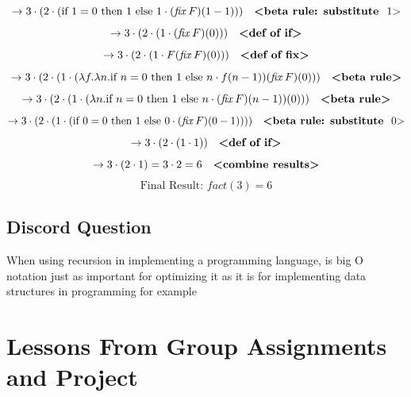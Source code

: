 \documentclass{article}
\theoremstyle{plain}
\theoremstyle{definition}
\theoremstyle{remark}
\begin{document}
\[
\to 3 \cdot (2 \cdot (\text{if } 1 = 0 \text{ then } 1 \text{ else } 1 \cdot (\mathit{fix} \, F)(1-1))) \quad \text{\textbf{<beta rule: substitute } 1\text{>}}
\]
\[
\to 3 \cdot (2 \cdot (1 \cdot (\mathit{fix} \, F)(0))) \quad \text{\textbf{<def of if>}}
\]
\[
\to 3 \cdot (2 \cdot (1 \cdot F(\mathit{fix} \, F)(0))) \quad \text{\textbf{<def of fix>}}
\]
\[
\to 3 \cdot (2 \cdot (1 \cdot (\lambda f. \lambda n. \text{if } n = 0 \text{ then } 1 \text{ else } n \cdot f(n-1))(\mathit{fix} \, F)(0))) \quad \text{\textbf{<beta rule>}}
\]
\[
\to 3 \cdot (2 \cdot (1 \cdot (\lambda n. \text{if } n = 0 \text{ then } 1 \text{ else } n \cdot (\mathit{fix} \, F)(n-1))(0))) \quad \text{\textbf{<beta rule>}}
\]
\[
\to 3 \cdot (2 \cdot (1 \cdot (\text{if } 0 = 0 \text{ then } 1 \text{ else } 0 \cdot (\mathit{fix} \, F)(0-1)))) \quad \text{\textbf{<beta rule: substitute } 0\text{>}}
\]
\[
\to 3 \cdot (2 \cdot (1 \cdot 1)) \quad \text{\textbf{<def of if>}}
\]
\[
\to 3 \cdot (2 \cdot 1) = 3 \cdot 2 = 6 \quad \text{\textbf{<combine results>}}
\]
\[
\text{Final Result: } \mathit{fact}(3) = 6
\]

\subsection{Discord Question}

When using recursion in implementing a programming language, is big O notation just as important for optimizing it as it is for implementing data structures in programming for example

\section{Lessons From Group Assignments and Project}\label{lessonsFromGroupAssignmentsAndProject}
\end{document}
